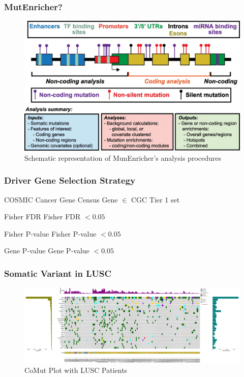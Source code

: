 \documentclass{beamer}
\begin{document}
    \begin{frame}
        \frametitle{MutEnricher?}

        \begin{figure}
            \includegraphics[width=0.8 \linewidth]{figures/Workflow/MutEnricher.jpg}
            \caption{Schematic representation of MunEnricher's analysis procedures \protect\cite{MutEnricher1}}
        \end{figure}
    \end{frame}

    \begin{frame}
        \frametitle{Driver Gene Selection Strategy}

        \begin{block}{COSMIC Cancer Gene Census \cite{CGC1}}
            Gene $\in$ CGC Tier 1 set
        \end{block}

        \begin{block}{Fisher FDR}
            Fisher FDR $ < 0.05$
        \end{block}

        \begin{block}{Fisher P-value}
            Fisher P-value $ < 0.05$
        \end{block}

        \begin{block}{Gene P-value}
            Gene P-value $ < 0.05 $
        \end{block}
    \end{frame}

    \begin{frame}
        \frametitle{Somatic Variant in LUSC}

        \begin{figure}
            \includegraphics[width=\linewidth]{figures/Mutect2/BWA-SQC.pdf}
            \caption{CoMut Plot with LUSC Patients}
        \end{figure}
    \end{frame}
\end{document}
